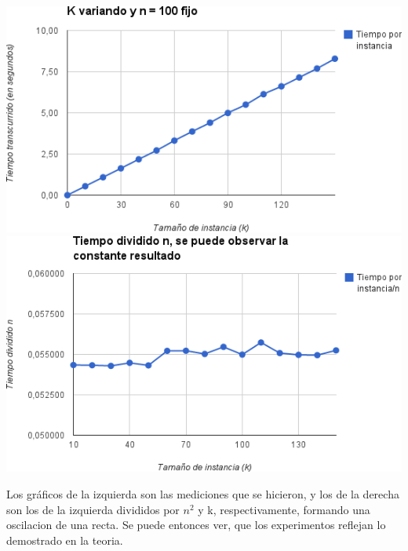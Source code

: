 \documentclass[10pt,a4paper]{article}
\begin{document}
\bigskip
\noindent \includegraphics[scale=0.45]{img/grafico_k.png}
\noindent \includegraphics[scale=0.45]{img/grafico_k2.png}

\bigskip
Los gráficos de la izquierda son las mediciones que se hicieron, y los de la derecha son los de la izquierda divididos por $n^2$ y k, respectivamente, formando una oscilacion de una recta. Se puede entonces ver, que los experimentos reflejan lo demostrado en la teoria.
\end{document}
